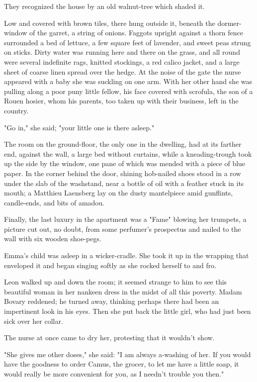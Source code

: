 \documentclass{tufte-book}
\begin{document}
They recognized the house by an old walnut-tree which shaded it.

Low and covered with brown tiles, there hung outside it, beneath the
dormer-window of the garret, a string of onions. Faggots upright
against a thorn fence surrounded a bed of lettuce, a few square feet of
lavender, and sweet peas strung on sticks. Dirty water was running here
and there on the grass, and all round were several indefinite rags,
knitted stockings, a red calico jacket, and a large sheet of coarse
linen spread over the hedge. At the noise of the gate the nurse appeared
with a baby she was suckling on one arm. With her other hand she was
pulling along a poor puny little fellow, his face covered with scrofula,
the son of a Rouen hosier, whom his parents, too taken up with their
business, left in the country.

"Go in," she said; "your little one is there asleep."

The room on the ground-floor, the only one in the dwelling, had at its
farther end, against the wall, a large bed without curtains, while a
kneading-trough took up the side by the window, one pane of which
was mended with a piece of blue paper. In the corner behind the door,
shining hob-nailed shoes stood in a row under the slab of the washstand,
near a bottle of oil with a feather stuck in its mouth; a Matthieu
Laensberg lay on the dusty mantelpiece amid gunflints, candle-ends, and
bits of amadou.

Finally, the last luxury in the apartment was a "Fame" blowing her
trumpets, a picture cut out, no doubt, from some perfumer's prospectus
and nailed to the wall with six wooden shoe-pegs.

Emma's child was asleep in a wicker-cradle. She took it up in the
wrapping that enveloped it and began singing softly as she rocked
herself to and fro.

Leon walked up and down the room; it seemed strange to him to see this
beautiful woman in her nankeen dress in the midst of all this poverty.
Madam Bovary reddened; he turned away, thinking perhaps there had been
an impertinent look in his eyes. Then she put back the little girl, who
had just been sick over her collar.

The nurse at once came to dry her, protesting that it wouldn't show.

"She gives me other doses," she said: "I am always a-washing of her. If
you would have the goodness to order Camus, the grocer, to let me have
a little soap, it would really be more convenient for you, as I needn't
trouble you then."
\end{document}
